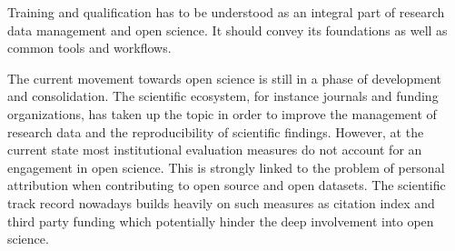 \documentclass[a4paper, 10pt, twocolumn]{article}
\begin{document}
Training and qualification has to be understood as an integral part of research data 
management and open science. It should convey its foundations as well as common tools 
and workflows.

The current movement towards open science is still in a phase of development and 
consolidation. The scientific ecosystem, for instance journals and funding organizations, 
has taken up the topic in order to improve the management of research data and the 
reproducibility of scientific findings. However, at the current state most institutional 
evaluation measures do not account for an engagement in open science. This is strongly 
linked to the problem of personal attribution when contributing to open source and open 
datasets. The scientific track record nowadays builds heavily on such measures as 
citation index and third party funding which potentially hinder the deep involvement 
into open science.

{
\small


}
\end{document}

